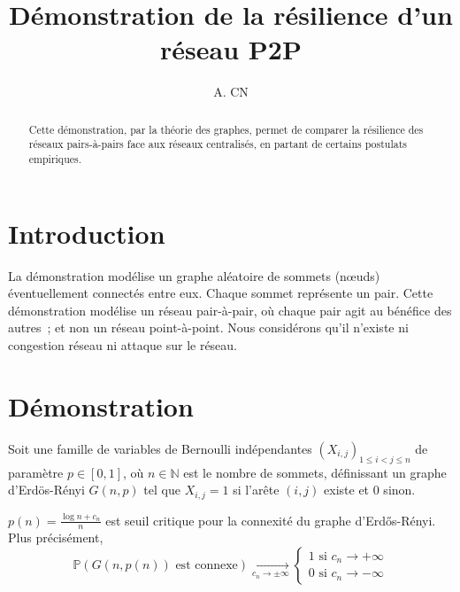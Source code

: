 \documentclass[french]{llncs}
\newcommand{\theauthor}{A. CN}
\newcommand{\thetitle}{Démonstration de la résilience d'un réseau P2P}
\begin{document}
\title{\thetitle}
\author{\theauthor}

\maketitle


\begin{abstract}
    Cette démonstration, par la théorie des graphes, permet de comparer la
    résilience des réseaux pairs-à-pairs face aux réseaux centralisés, en
    partant de certains postulats empiriques.
\end{abstract}

\section{Introduction}

La démonstration modélise un graphe aléatoire de sommets (n\oe{}uds) 
éventuellement connectés entre eux. Chaque sommet représente un pair. Cette 
démonstration modélise un réseau pair-à-pair, où chaque pair agit au bénéfice 
des autres~; et non un réseau point-à-point. Nous considérons qu'il n'existe ni 
congestion réseau ni attaque sur le réseau.

\section{Démonstration}

Soit une famille de variables de Bernoulli indépendantes 
\(\left(X_{i,j}\right)_{1 \le i < j \le n}\) de paramètre \(p \in 
\left[0,1\right]\), où \(n \in \mathbb{N}\) est le nombre de sommets, 
définissant un graphe d'Erdös-Rényi\cite{erdos1960} \(G(n,p)\) tel que 
\(X_{i,j}=1\) si l'arête \((i,j)\) existe et \(0\) sinon.

\nocite{gayral2017} \nocite{thevenin2016} %

\begin{theorem}[Connexité]\label{thm:connected}
  \(p(n) = \frac{\log n + c_n}{n}\) est seuil critique pour la connexité du 
graphe d'Erdős-Rényi.
  Plus précisément,
  \[
      \mathbb{P}(G(n,p(n)) \text{ est connexe}) 
\mathop{\to}\limits_{c_n\to\pm\infty}
      \begin{cases}
          1 \text{ si } c_n \to +\infty\\
          0 \text{ si } c_n \to -\infty
      \end{cases}
  \]
\end{theorem}
\end{document}
